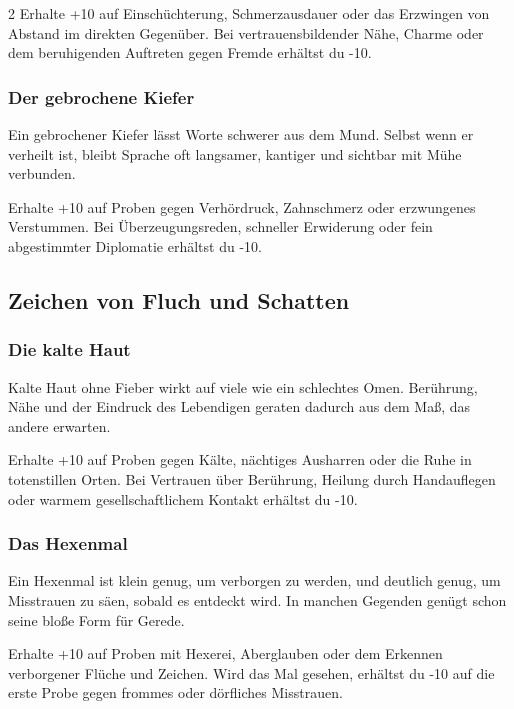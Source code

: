 {\begin{multicols*}{2}
        \malspielwertebox
        {Erhalte +10 auf Einschüchterung, Schmerzausdauer oder das Erzwingen von Abstand im direkten Gegenüber.}
        {Bei vertrauensbildender Nähe, Charme oder dem beruhigenden Auftreten gegen Fremde erhältst du -10.}

        \subsubsection*{Der gebrochene Kiefer}
        Ein gebrochener Kiefer lässt Worte schwerer aus dem Mund. Selbst wenn er verheilt ist, bleibt Sprache oft langsamer, kantiger und sichtbar mit Mühe verbunden.

        \malspielwertebox
        {Erhalte +10 auf Proben gegen Verhördruck, Zahnschmerz oder erzwungenes Verstummen.}
        {Bei Überzeugungsreden, schneller Erwiderung oder fein abgestimmter Diplomatie erhältst du -10.}

        \subsection{Zeichen von Fluch und Schatten}\label{subsec:male-fluch}

        \subsubsection*{Die kalte Haut}
        Kalte Haut ohne Fieber wirkt auf viele wie ein schlechtes Omen. Berührung, Nähe und der Eindruck des Lebendigen geraten dadurch aus dem Maß, das andere erwarten.

        \malspielwertebox
        {Erhalte +10 auf Proben gegen Kälte, nächtiges Ausharren oder die Ruhe in totenstillen Orten.}
        {Bei Vertrauen über Berührung, Heilung durch Handauflegen oder warmem gesellschaftlichem Kontakt erhältst du -10.}

        \subsubsection*{Das Hexenmal}
        Ein Hexenmal ist klein genug, um verborgen zu werden, und deutlich genug, um Misstrauen zu säen, sobald es entdeckt wird. In manchen Gegenden genügt schon seine bloße Form für Gerede.

        \malspielwertebox
        {Erhalte +10 auf Proben mit Hexerei, Aberglauben oder dem Erkennen verborgener Flüche und Zeichen.}
        {Wird das Mal gesehen, erhältst du -10 auf die erste Probe gegen frommes oder dörfliches Misstrauen.}


\end{multicols*}}

